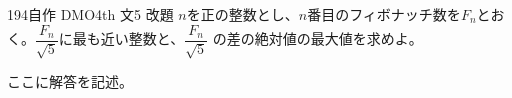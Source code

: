 \begin{prob}{194}{}{自作 DMO4th 文5 改題}
 $n$を正の整数とし、$n$番目のフィボナッチ数を$F_n$とおく。$\dfrac{F_n}{\sqrt{5}}$に最も近い整数と、$\dfrac{F_n}{\sqrt{5}}$ の差の絶対値の最大値を求めよ。
\end{prob}
ここに解答を記述。